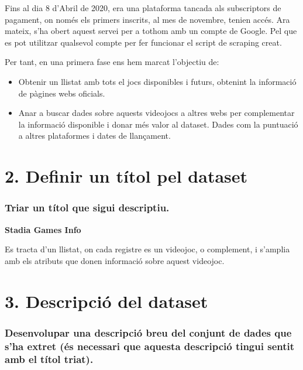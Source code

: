 \documentclass[]{article}
\providecommand{\tightlist}{%
  \setlength{\itemsep}{0pt}\setlength{\parskip}{0pt}}
\begin{document}
Fins al dia 8 d'Abril de 2020, era una plataforma tancada als
subscriptors de pagament, on només els primers inscrits, al mes de
novembre, tenien accés. Ara mateix, s'ha obert aquest servei per a
tothom amb un compte de Google. Pel que es pot utilitzar qualsevol
compte per fer funcionar el script de scraping creat.

Per tant, en una primera fase ens hem marcat l'objectiu de:

\begin{itemize}
\tightlist
\item
  Obtenir un llistat amb tots el jocs disponibles i futurs, obtenint la
  informació de pàgines webs oficials.
\item
  Anar a buscar dades sobre aquests videojocs a altres webs per
  complementar la informació disponible i donar més valor al dataset.
  Dades com la puntuació a altres plataformes i dates de llançament.
\end{itemize}

\hypertarget{definir-un-tuxedtol-pel-dataset}{%
\section{2. Definir un títol pel
dataset}\label{definir-un-tuxedtol-pel-dataset}}

\hypertarget{triar-un-tuxedtol-que-sigui-descriptiu.}{%
\subsubsection{Triar un títol que sigui
descriptiu.}\label{triar-un-tuxedtol-que-sigui-descriptiu.}}

\textbf{Stadia Games Info}

Es tracta d'un llistat, on cada registre es un videojoc, o complement, i
s'amplia amb els atributs que donen informació sobre aquest videojoc.

\hypertarget{descripciuxf3-del-dataset}{%
\section{3. Descripció del dataset}\label{descripciuxf3-del-dataset}}

\hypertarget{desenvolupar-una-descripciuxf3-breu-del-conjunt-de-dades-que-sha-extret-uxe9s-necessari-que-aquesta-descripciuxf3-tingui-sentit-amb-el-tuxedtol-triat.}{%
\subsubsection{Desenvolupar una descripció breu del conjunt de dades que
s'ha extret (és necessari que aquesta descripció tingui sentit amb el
títol
triat).}\label{desenvolupar-una-descripciuxf3-breu-del-conjunt-de-dades-que-sha-extret-uxe9s-necessari-que-aquesta-descripciuxf3-tingui-sentit-amb-el-tuxedtol-triat.}}
\end{document}
